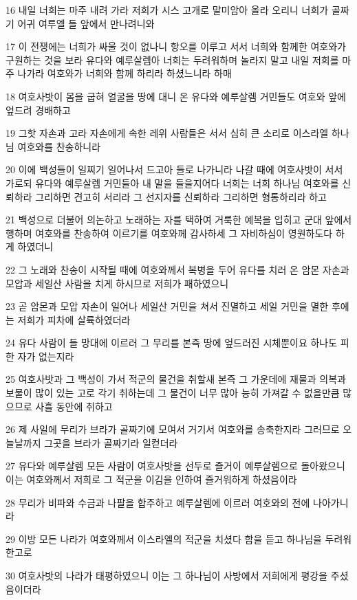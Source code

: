 \par 16 내일 너희는 마주 내려 가라 저희가 시스 고개로 말미암아 올라 오리니 너희가 골짜기 어귀 여루엘 들 앞에서 만나려니와
\par 17 이 전쟁에는 너희가 싸울 것이 없나니 항오를 이루고 서서 너희와 함께한 여호와가 구원하는 것을 보라 유다와 예루살렘아 너희는 두려워하며 놀라지 말고 내일 저희를 마주 나가라 여호와가 너희와 함께 하리라 하셨느니라 하매
\par 18 여호사밧이 몸을 굽혀 얼굴을 땅에 대니 온 유다와 예루살렘 거민들도 여호와 앞에 엎드려 경배하고
\par 19 그핫 자손과 고라 자손에게 속한 레위 사람들은 서서 심히 큰 소리로 이스라엘 하나님 여호와를 찬송하니라
\par 20 이에 백성들이 일찌기 일어나서 드고아 들로 나가니라 나갈 때에 여호사밧이 서서 가로되 유다와 예루살렘 거민들아 내 말을 들을지어다 너희는 너희 하나님 여호와를 신뢰하라 그리하면 견고히 서리라 그 선지자를 신뢰하라 그리하면 형통하리라 하고
\par 21 백성으로 더불어 의논하고 노래하는 자를 택하여 거룩한 예복을 입히고 군대 앞에서 행하며 여호와를 찬송하여 이르기를 여호와께 감사하세 그 자비하심이 영원하도다 하게 하였더니
\par 22 그 노래와 찬송이 시작될 때에 여호와께서 복병을 두어 유다를 치러 온 암몬 자손과 모압과 세일산 사람을 치게 하시므로 저희가 패하였으니
\par 23 곧 암몬과 모압 자손이 일어나 세일산 거민을 쳐서 진멸하고 세일 거민을 멸한 후에는 저희가 피차에 살륙하였더라
\par 24 유다 사람이 들 망대에 이르러 그 무리를 본즉 땅에 엎드러진 시체뿐이요 하나도 피한 자가 없는지라
\par 25 여호사밧과 그 백성이 가서 적군의 물건을 취할새 본즉 그 가운데에 재물과 의복과 보물이 많이 있는 고로 각기 취하는데 그 물건이 너무 많아 능히 가져갈 수 없을만큼 많으므로 사흘 동안에 취하고
\par 26 제 사일에 무리가 브라가 골짜기에 모여서 거기서 여호와를 송축한지라 그러므로 오늘날까지 그곳을 브라가 골짜기라 일컫더라
\par 27 유다와 예루살렘 모든 사람이 여호사밧을 선두로 즐거이 예루살렘으로 돌아왔으니 이는 여호와께서 저희로 그 적군을 이김을 인하여 즐거워하게 하셨음이라
\par 28 무리가 비파와 수금과 나팔을 합주하고 예루살렘에 이르러 여호와의 전에 나아가니라
\par 29 이방 모든 나라가 여호와께서 이스라엘의 적군을 치셨다 함을 듣고 하나님을 두려워한고로
\par 30 여호사밧의 나라가 태평하였으니 이는 그 하나님이 사방에서 저희에게 평강을 주셨음이더라
